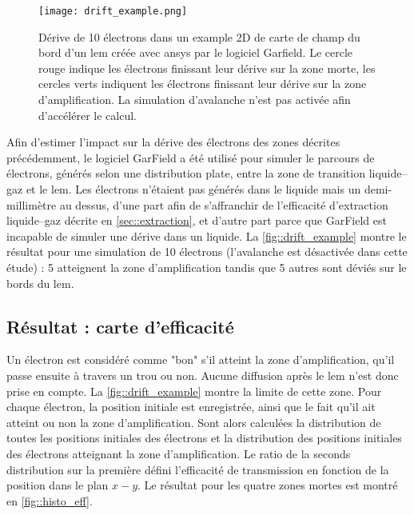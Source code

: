         \begin{figure}[!htb]
          \centering
          \texttt{[image: drift\_example.png]}
          \caption[Dérive de 10 électrons dans la carte de champ du bord d'un LEM avec Garfield]{Dérive de 10 électrons dans un example 2D de carte de champ du bord d'un \gls{lem} créée avec \gls{ansys} par le logiciel Garfield. Le cercle rouge indique les électrons finissant leur dérive sur la zone morte, les cercles verts indiquent les électrons finissant leur dérive sur la zone d'amplification. La simulation d'avalanche n'est pas activée afin d'accélérer le calcul.}
          \label{fig::drift_example}
        \end{figure}
                
        Afin d'estimer l'impact sur la dérive des électrons des zones décrites précédemment, le logiciel GarField \cite{garfield} a été utilisé pour simuler le parcours de  électrons, générés selon une distribution plate, entre la zone de transition liquide--gaz et le \gls{lem}. Les électrons n'étaient pas générés dans le liquide mais un demi-millimètre au dessus, d'une part afin de s'affranchir de l'efficacité d'extraction liquide--gaz décrite en \autoref{sec::extraction}, et d'autre part parce que GarField est incapable de simuler une dérive dans un liquide. La \autoref{fig::drift_example} montre le résultat pour une simulation de 10 électrons (l'avalanche est désactivée dans cette étude) : 5 atteignent la zone d'amplification tandis que 5 autres sont déviés sur le bords du \gls{lem}.
                
    \subsection{Résultat : carte d'efficacité}
        
      Un électron est considéré comme "bon" s'il atteint la zone d'amplification, qu'il passe ensuite à travers un trou ou non. Aucune diffusion après le \gls{lem} n'est donc prise en compte. La \autoref{fig::drift_example} montre la limite de cette zone. Pour chaque électron, la position initiale est enregistrée, ainsi que le fait qu'il ait atteint ou non la zone d'amplification. Sont alors calculées la distribution de toutes les positions initiales des électrons et la distribution des positions initiales des électrons atteignant la zone d'amplification. Le ratio de la seconds distribution sur la première défini l'efficacité de transmission en fonction de la position dans le plan $x-y$. Le résultat pour les quatre zones mortes est montré en \autoref{fig::histo_eff}.
            
